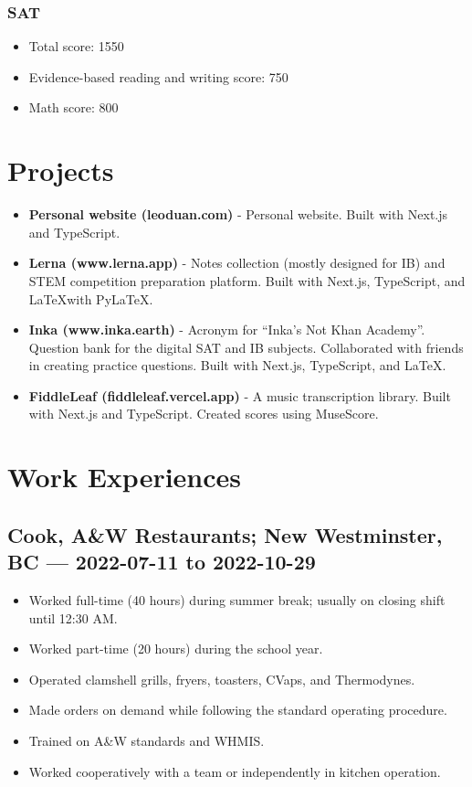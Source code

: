 \documentclass{article}
\begin{document}
\subsubsection*{SAT}

\begin{itemize}
	\item Total score: 1550
	\item Evidence-based reading and writing score: 750
	\item Math score: 800
\end{itemize}

\section*{Projects}

\begin{itemize}
	\item \textbf{Personal website (leoduan.com)} - Personal website. Built with Next.js and TypeScript.
	\item \textbf{Lerna (www.lerna.app)} - Notes collection (mostly designed for IB) and STEM competition preparation platform. Built with Next.js, TypeScript, and \LaTeX with PyLaTeX.
	\item \textbf{Inka (www.inka.earth)} - Acronym for ``Inka's Not Khan Academy''. Question bank for the digital SAT and IB subjects. Collaborated with friends in creating practice questions. Built with Next.js, TypeScript, and \LaTeX.
	\item \textbf{FiddleLeaf (fiddleleaf.vercel.app)} - A music transcription library. Built with Next.js and TypeScript. Created scores using MuseScore.
\end{itemize}

\section*{Work Experiences}

\subsection*{Cook, A\&W Restaurants; New Westminster, BC — 2022-07-11 to 2022-10-29}

\begin{itemize}
	\item Worked full-time (40 hours) during summer break; usually on closing shift until 12:30 AM.
	\item Worked part-time (20 hours) during the school year.
	\item Operated clamshell grills, fryers, toasters, CVaps, and Thermodynes.
	\item Made orders on demand while following the standard operating procedure.
	\item Trained on A\&W standards and WHMIS.
	\item Worked cooperatively with a team or independently in kitchen operation.
\end{itemize}
\end{document}
